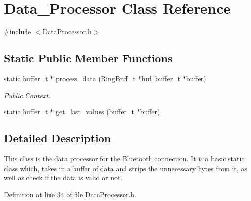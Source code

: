\hypertarget{class_data___processor}{\section{\-Data\-\_\-\-Processor \-Class \-Reference}
\label{class_data___processor}
}


{\ttfamily \#include $<$\-Data\-Processor.\-h$>$}

\subsection*{\-Static \-Public \-Member \-Functions}
\begin{DoxyCompactItemize}
\item 
static \hyperlink{structbuffer__t}{buffer\-\_\-t} $\ast$ \hyperlink{class_data___processor_a8b2be0f52a50049c5f593ef6959bf0b4}{process\-\_\-data} (\hyperlink{struct_ring_buff__t}{\-Ring\-Buff\-\_\-t} $\ast$buf, \hyperlink{structbuffer__t}{buffer\-\_\-t} $\ast$buffer)
\begin{DoxyCompactList}\small\item\em \-Public \-Context. \end{DoxyCompactList}\item 
static \hyperlink{structbuffer__t}{buffer\-\_\-t} $\ast$ \hyperlink{class_data___processor_a4627145ab48592923dceb52e4b1ff434}{get\-\_\-last\-\_\-values} (\hyperlink{structbuffer__t}{buffer\-\_\-t} $\ast$buffer)
\end{DoxyCompactItemize}


\subsection{\-Detailed \-Description}
\-This class is the data processor for the \-Bluetooth connection. \-It is a basic static class which, takes in a buffer of data and strips the unnecessary bytes from it, as well as check if the data is valid or not. 

\-Definition at line 34 of file \-Data\-Processor.\-h.



